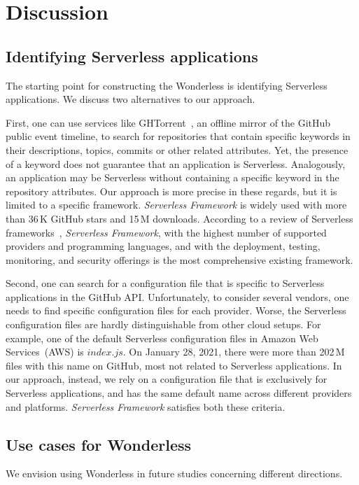 
\section{Discussion}
\label{discussion}

\subsection{Identifying Serverless applications} \label{discOnSF}
The starting point for constructing the Wonderless is identifying Serverless 
applications. We discuss two alternatives to our approach.

First, one can use services like GHTorrent~\cite{gousios2012ghtorrent}, 
an offline mirror of the GitHub public event timeline, to search for repositories 
that contain specific keywords in their descriptions, topics, commits or other 
related attributes. Yet, the presence of a keyword does not guarantee 
that an application is Serverless. Analogously, an application may be Serverless 
without containing a specific keyword in the repository attributes.
Our approach is more precise in these regards, 
but it is limited to a specific framework. 
\emph{Serverless Framework} is widely used with more than 36\,K GitHub stars 
and 15\,M downloads. According to a review of Serverless 
frameworks~\cite{kritikos2018review}, \emph{Serverless Framework},
with the highest number of supported providers 
and programming languages, and with the deployment, testing, 
monitoring, and security offerings is the most comprehensive existing framework. 

Second, one can search for a configuration file that is 
specific to Serverless applications in the GitHub API. Unfortunately, to consider several vendors, 
one needs to find specific configuration files for each provider.
Worse, the Serverless configuration files are hardly distinguishable from other cloud setups. 
For example, one of the default Serverless configuration files in Amazon 
Web Services~(AWS) is $index.js$. On January 28, 2021, there were 
more than 202\,M files with this name on GitHub, most not 
related to Serverless applications. 
In our approach, instead, we rely on a configuration file that is exclusively 
for Serverless applications, and has the same default name across 
different providers and platforms. \emph{Serverless Framework} 
satisfies both these criteria.

\subsection{Use cases for Wonderless}
We envision using Wonderless in future studies 
concerning different directions.

